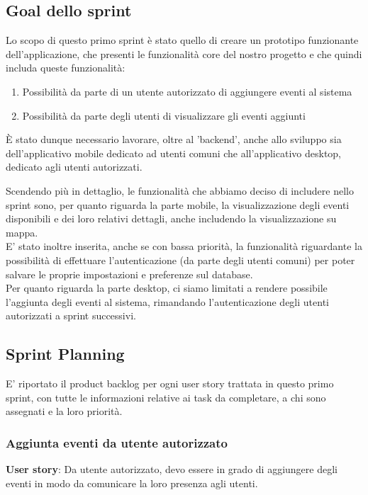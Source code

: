 \documentclass{article}
\begin{document}
\subsection{Goal dello sprint}

Lo scopo di questo primo sprint è stato quello di creare un prototipo funzionante dell'applicazione, che presenti le funzionalità core del nostro progetto e che quindi includa queste funzionalità:
\begin{enumerate}
\item Possibilità da parte di un utente autorizzato di aggiungere eventi al sistema
\item Possibilità da parte degli utenti di visualizzare gli eventi aggiunti
\end{enumerate}
È stato dunque necessario lavorare, oltre al 'backend', anche allo sviluppo sia dell'applicativo mobile dedicato ad utenti comuni che all'applicativo desktop, dedicato agli utenti autorizzati.

Scendendo più in dettaglio, le funzionalità che abbiamo deciso di includere nello sprint sono, per quanto riguarda la parte mobile, la visualizzazione degli eventi disponibili e dei loro relativi dettagli, anche includendo la visualizzazione su mappa.\\
E' stato inoltre inserita, anche se con bassa priorità, la funzionalità riguardante la possibilità di effettuare l'autenticazione (da parte degli utenti comuni) per poter salvare le proprie impostazioni e preferenze sul database.\\
Per quanto riguarda la parte desktop, ci siamo limitati a rendere possibile l'aggiunta degli eventi al sistema, rimandando l'autenticazione degli utenti autorizzati a sprint successivi.

\subsection{Sprint Planning}
E' riportato il product backlog per ogni user story trattata in questo primo sprint, con tutte le informazioni relative ai task da completare, a chi sono assegnati e la loro priorità.\\
\subsubsection{Aggiunta eventi da utente autorizzato}
\textbf{User story}: Da utente autorizzato, devo essere in grado di aggiungere degli eventi in modo da comunicare la loro presenza agli utenti.\\
\end{document}
